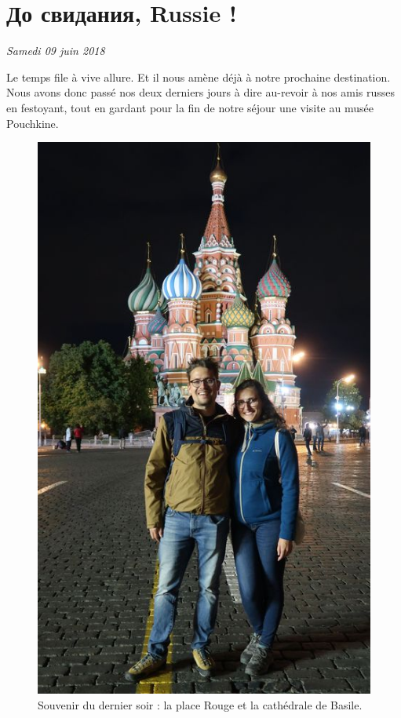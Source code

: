 \hypertarget{ux434ux43e-ux441ux432ux438ux434ux430ux43dux438ux44f-russie}{%
\section{До свидания, Russie
!}\label{ux434ux43e-ux441ux432ux438ux434ux430ux43dux438ux44f-russie}}

\emph{Samedi 09 juin 2018}

Le temps file à vive allure. Et il nous amène déjà à notre prochaine
destination. Nous avons donc passé nos deux derniers jours à dire
au-revoir à nos amis russes en festoyant, tout en gardant pour la fin de
notre séjour une visite au musée Pouchkine.

\begin{figure}
\centering
\includegraphics{images/20180609_aurevoir.JPG}
\caption{Souvenir du dernier soir : la place Rouge et la cathédrale de
Basile.}
\end{figure}

